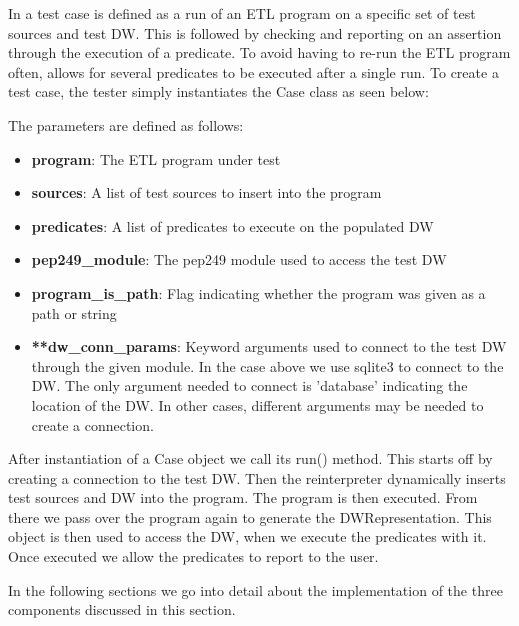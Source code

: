In \FW{} a test case is defined as a run of an ETL program on a specific set of test sources and test DW. This is followed by checking and reporting on an assertion through the execution of a predicate. To avoid having to re-run the ETL program often, \FW{} allows for several predicates to be executed after a single run. To create a test case, the tester simply instantiates the Case class as seen below:


The parameters are defined as follows:
\begin{itemize}
\item \textbf{program}: The ETL program under test
\item \textbf{sources}: A list of test sources to insert into the program
\item \textbf{predicates}: A list of predicates to execute on the populated DW
\item \textbf{pep249\_module}: The pep249 module used to access the test DW
\item \textbf{program\_is\_path}: Flag indicating whether the program was given as a path or string
\item \textbf{**dw\_conn\_params}: Keyword arguments used to connect to the test DW through the given module. In the case above we use sqlite3 to connect to the DW. The only argument needed to connect is 'database' indicating the location of the DW. In other cases, different arguments may be needed to create a connection.
\end{itemize}

After instantiation of a Case object we call its run() method. This starts off by creating a connection to the test DW. Then the reinterpreter dynamically inserts test sources and DW into the program. The program is then executed. From there we pass over the program again to generate the DWRepresentation. This object is then used to access the DW, when we execute the predicates with it. Once executed we allow the predicates to report to the user.

In the following sections we go into detail about the implementation of the three components discussed in this section.







